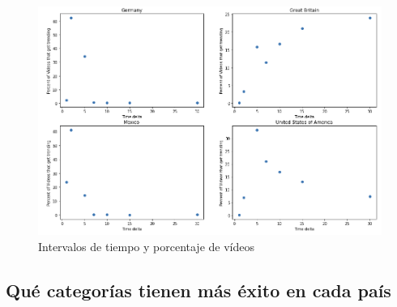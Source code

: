 \documentclass[a4paper,12pt]{article}
\begin{document}
\begin{figure}[h!]
\centering
\includegraphics[width=13cm]{plot_freq_perc.png}
\caption{Intervalos de tiempo y porcentaje de v\'ideos}
\label{fig:tiempo_3}
\end{figure}



\subsection{Qu\'e categor\'ias tienen m\'as \'exito en cada pa\'is}
\end{document}
